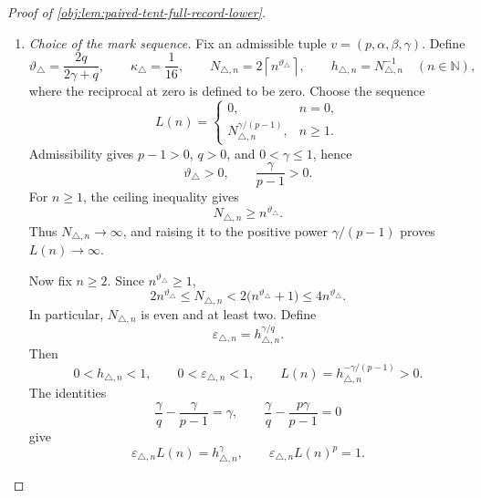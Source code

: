 \documentclass[11pt]{article}
\begin{document}
\begin{proof}[Proof of \cref{obj:lem:paired-tent-full-record-lower}]
\begin{enumerate}
\item \emph{Choice of the mark sequence.}
Fix an admissible tuple \(v=(p,\alpha,\beta,\gamma)\). Define
\[
\vartheta_\triangle=\frac{2q}{2\gamma+q},
\qquad
\kappa_\triangle=\frac1{16},
\qquad
N_{\triangle,n}=2\left\lceil n^{\vartheta_\triangle}\right\rceil,
\qquad
h_{\triangle,n}=N_{\triangle,n}^{-1}
\quad(n\in\mathbb N),
\]
where the reciprocal at zero is defined to be zero. Choose the sequence
\[
L(n)=
\begin{cases}
0,&n=0,\\
N_{\triangle,n}^{\gamma/(p-1)},&n\ge1.
\end{cases}
\]
Admissibility gives \(p-1>0\), \(q>0\), and \(0<\gamma\le1\), hence
\[
\vartheta_\triangle>0,
\qquad
\frac{\gamma}{p-1}>0.
\]
For \(n\ge1\), the ceiling inequality gives
\[
N_{\triangle,n}\ge n^{\vartheta_\triangle}.
\]
Thus \(N_{\triangle,n}\to\infty\), and raising it to the positive power
\(\gamma/(p-1)\) proves \(L(n)\to\infty\).

Now fix \(n\ge2\). Since \(n^{\vartheta_\triangle}\ge1\),
\[
2n^{\vartheta_\triangle}
\le N_{\triangle,n}
<2\bigl(n^{\vartheta_\triangle}+1\bigr)
\le4n^{\vartheta_\triangle}.
\]
In particular, \(N_{\triangle,n}\) is even and at least two. Define
\[
\varepsilon_{\triangle,n}
=h_{\triangle,n}^{\gamma/q}.
\]
Then
\[
0<h_{\triangle,n}<1,
\qquad
0<\varepsilon_{\triangle,n}<1,
\qquad
L(n)=h_{\triangle,n}^{-\gamma/(p-1)}>0.
\]
The identities
\[
\frac{\gamma}{q}-\frac{\gamma}{p-1}=\gamma,
\qquad
\frac{\gamma}{q}-\frac{p\gamma}{p-1}=0
\]
give
\[
\varepsilon_{\triangle,n}L(n)=h_{\triangle,n}^{\gamma},
\qquad
\varepsilon_{\triangle,n}L(n)^p=1.
\]


\end{enumerate}
\end{proof}
\end{document}
